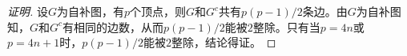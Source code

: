 \begin{proof}[证明]
  设$G$为自补图，有$p$个顶点，则$G$和$G^c$共有$p(p-1)/2$条边。由$G$为自补图知，$G$和$G^c$有相同的边数，从而$p(p-1)/2$能被$2$整除。只有当$p=4n$或$p=4n+1$时，$p(p-1)/2$能被$2$整除，结论得证。
\end{proof}
